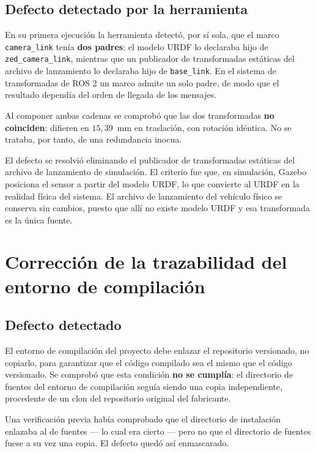 \documentclass[12pt,letterpaper]{article}
\begin{document}
\subsection{Defecto detectado por la herramienta}

En su primera ejecución la herramienta detectó, por sí sola, que el marco \texttt{camera\_link} tenía \textbf{dos padres}: el modelo URDF lo declaraba hijo de \texttt{zed\_camera\_link}, mientras que un publicador de transformadas estáticas del archivo de lanzamiento lo declaraba hijo de \texttt{base\_link}. En el sistema de transformadas de ROS 2 un marco admite un solo padre, de modo que el resultado dependía del orden de llegada de los mensajes.

Al componer ambas cadenas se comprobó que las dos transformadas \textbf{no coinciden}: difieren en $15{,}39$~mm en traslación, con rotación idéntica. No se trataba, por tanto, de una redundancia inocua.

El defecto se resolvió eliminando el publicador de transformadas estáticas del archivo de lanzamiento de simulación. El criterio fue que, en simulación, Gazebo posiciona el sensor a partir del modelo URDF, lo que convierte al URDF en la realidad física del sistema. El archivo de lanzamiento del vehículo físico se conserva sin cambios, puesto que allí no existe modelo URDF y esa transformada es la única fuente.

\section{Corrección de la trazabilidad del entorno de compilación}
\label{sec:trazabilidad}

\subsection{Defecto detectado}

El entorno de compilación del proyecto debe enlazar el repositorio versionado, no copiarlo, para garantizar que el código compilado sea el mismo que el código versionado. Se comprobó que esta condición \textbf{no se cumplía}: el directorio de fuentes del entorno de compilación seguía siendo una copia independiente, procedente de un clon del repositorio original del fabricante.

Una verificación previa había comprobado que el directorio de instalación enlazaba al de fuentes --- lo cual era cierto --- pero no que el directorio de fuentes fuese a su vez una copia. El defecto quedó así enmascarado.
\end{document}
